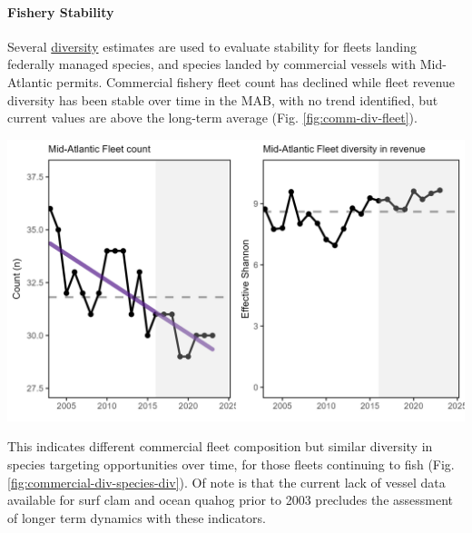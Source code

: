 \documentclass[
  10pt,
]{article}
\let\origfigure\figure
\let\endorigfigure\endfigure
\renewenvironment{figure}[1][2] {
    \expandafter\origfigure\expandafter[H]
} {
    \endorigfigure
}
\begin{document}
\paragraph{Fishery Stability}\label{fishery-stability}

Several \href{https://noaa-edab.github.io/catalog/commercial_div.html}{diversity} estimates are used to evaluate stability for fleets landing federally managed species, and species landed by commercial vessels with Mid-Atlantic permits. Commercial fishery fleet count has declined while fleet revenue diversity has been stable over time in the MAB, with no trend identified, but current values are above the long-term average (Fig. \ref{fig:comm-div-fleet}).

\begin{figure}

{\centering \includegraphics[width=6.5in]{images/MidAtlantic/comm_div_fleet_MidAtlantic_2025-09-05} 

}

\caption{Commercial fleet count (left) and fleet diversity in revenue (right) in the Mid-Atlantic (black) with significant decline in fleet count (purple line).}\label{fig:comm-div-fleet}
\end{figure}

This indicates different commercial fleet composition but similar diversity in species targeting opportunities over time, for those fleets continuing to fish (Fig. \ref{fig:commercial-div-species-div}). Of note is that the current lack of vessel data available for surf clam and ocean quahog prior to 2003 precludes the assessment of longer term dynamics with these indicators.
\end{document}
